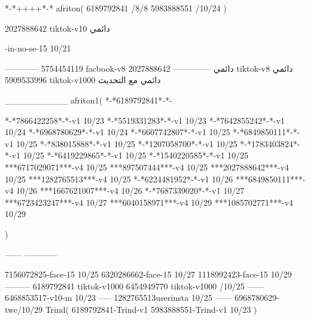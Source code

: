 *-*++++*-*
afriton(
6189792841 /8/8
5983888551 /10/24
)

2027888642 tiktok-v10
دائمي


-in-no-se-15 10/21

------------
5754454119 facbook-v8
دائمي
--------------
2027888642 tiktok-v8
دائمي
5909533996 tiktok-v1000
دائمي مع التحديث

__________
afriton1(
*-*6189792841*-*-

*-*7866422258*-*-v1 10/23
*-*5519331283*-*-v1 10/23
*-*7642855242*-*-v1 10/24
*-*6968780629*-*-v1 10/24
*-*6607742807*-*-v1 10/25
*-*6849850111*-*-v1 10/25
*-*838015888*-*-v1 10/25
*-*1207058700*-*-v1 10/25
*-*1783403824*-*-v1 10/25
*-*6419229865*-*-v1 10/25
*-*1540220585*-*-v1 10/25
***6717029071***-v4 10/25
***897507444***-v4 10/25
***2027888642***-v4 10/25
***1282765513***-v4 10/25
*-*6224481952*-*-v1 10/26
***6849850111***-v4 10/26
***1667621007***-v4 10/26
*-*7687339020*-*-v1 10/27
***6723423247***-v4 10/27
***6040158971***-v4 10/29
***1085702771***-v4 10/29

)

------
------------

7156072825-face-15 10/25
6320286662-face-15 10/27
1118992423-face-15 10/29
---------
6189792841 tiktok-v1000
6454949770 tiktok-v1000 /10/25
------
6468853517-v10-m 10/23
-----
1282765513userinsta 10/25
------
6968780629-twe/10/29
Trind(
6189792841-Trind-v1 
5983888551-Trind-v1 10/23
)
